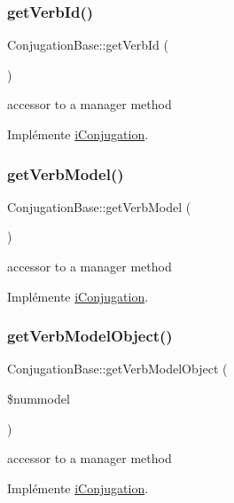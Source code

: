 \subsubsection{\texorpdfstring{get\+Verb\+Id()}{getVerbId()}}
{\footnotesize\ttfamily Conjugation\+Base\+::get\+Verb\+Id (\begin{DoxyParamCaption}{ }\end{DoxyParamCaption})}

accessor to a manager method 

Implémente \hyperlink{interfacei_conjugation_aa34e7af66125d28af4f485529d456a74}{i\+Conjugation}.

\hypertarget{class_conjugation_base_aaa7ecb3341682d48f2d2b42810de2ac2}{}\label{class_conjugation_base_aaa7ecb3341682d48f2d2b42810de2ac2} 
\subsubsection{\texorpdfstring{get\+Verb\+Model()}{getVerbModel()}}
{\footnotesize\ttfamily Conjugation\+Base\+::get\+Verb\+Model (\begin{DoxyParamCaption}{ }\end{DoxyParamCaption})}

accessor to a manager method 

Implémente \hyperlink{interfacei_conjugation_ab5482cc8f8e9f58dc852aff604813b6e}{i\+Conjugation}.

\hypertarget{class_conjugation_base_a31a6fb3f63b144c6d9f0e9a27d3d28cc}{}\label{class_conjugation_base_a31a6fb3f63b144c6d9f0e9a27d3d28cc} 
\subsubsection{\texorpdfstring{get\+Verb\+Model\+Object()}{getVerbModelObject()}}
{\footnotesize\ttfamily Conjugation\+Base\+::get\+Verb\+Model\+Object (\begin{DoxyParamCaption}\item[{}]{\$nummodel }\end{DoxyParamCaption})}

accessor to a manager method 

Implémente \hyperlink{interfacei_conjugation_ab076acd6674f8effbf5306d6b92f3ad3}{i\+Conjugation}.

